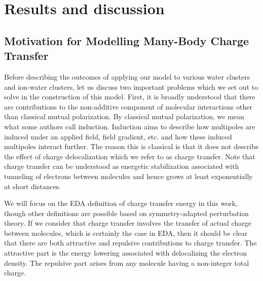 \documentclass[journal=jacsat,manuscript=article]{achemso}
\begin{document}
\section*{Results and discussion}
\subsection*{Motivation for Modelling Many-Body Charge Transfer}

Before describing the outcomes of applying our model to various water clusters and
ion-water clusters, let us discuss two important problems which we set out to solve
in the construction of this model. First, it is broadly understood that there are
contributions to the non-additive component of molecular interactions other than
classical mutual polarization. By classical mutual polarization, we mean what some
authors call induction.\cite{herman2023accurate} Induction aims to describe
how multipoles are induced under an applied field, field gradient, etc.
and how these induced multipoles interact further. The reason this is classical
is that it does not describe the effect of charge delocalization which we refer to
as charge transfer. Note that charge transfer can be understood as energetic
stabilization associated with tunneling of electrons between molecules
and hence grows at least exponentially at short distances.\cite{misquitta2013charge}

We will focus on the EDA definition of charge transfer energy in this work, though
other definitions are possible based on symmetry-adapted perturbation theory.\cite{stone2009charge,misquitta2013charge}
If we consider that charge transfer involves the transfer of actual charge between
molecules, which is certainly the case in EDA\cite{thirman2018characterizing},
then it should be clear that there are both attractive and repulsive contributions
to charge transfer. The attractive part is the energy lowering associated with delocalizing
the electron density. The repulsive part arises from any molecule having a non-integer
total charge.
\end{document}

